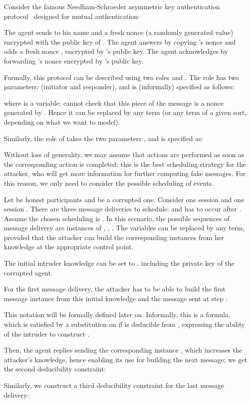 \documentclass[acmtocl,acmnow]{acmtrans2m}
\newcommand{\dedcons}[1]{deducibility constraint}
\begin{document}
\begin{example}\label{ex:ns}
Consider the famous Needham-Schroeder asymmetric key
authentication protocol~\cite{NS78} designed for mutual authentication:

The agent  sends to  his name and a fresh nonce (a randomly generated value) encrypted with the public
key of . The agent  answers by copying 's nonce and adds a fresh nonce , encrypted by 's
public key. The agent  acknowledges by forwarding 's nonce encrypted by 's public key. 

Formally, this protocol can be described using two roles  and .
The role  has two parameters:  (initiator and responder), and
is (informally) specified as follows:

where  is a variable:  cannot check that this piece of the message is
a nonce generated by . Hence it can be replaced by any term (or any term
of a given sort, depending on what we want to model). 

Similarly, the role of  takes the two parameters , and is specified as:







Without loss of generality, we may assume that  actions are
performed as soon as the corresponding  action is completed:
this is the best scheduling strategy for the attacker, who will get more
information for further computing fake messages. For this reason, we only need
to consider the possible scheduling of  events.


Let  be honest participants and  be a corrupted one.
Consider one session  and one session .
There are three message deliveries to schedule:  and  has to
occur after . Assume the chosen scheduling is .
In this scenario, the possible sequences of message  delivery are
instances of , ,
.  The variables  can be replaced by any term, provided that
the attacker can build the corresponding instances from her knowledge at
the appropriate control point.


The initial intruder knowledge can be set to
, including the private
key of the corrupted agent.

For the first message delivery, the attacker has to be able to build
the first message instance from this initial knowledge and the message
sent at step :


This notation will be formally defined later on. Informally, this is
a formula, which is satisfied by a substitution  on  if
 is deducible from , expressing
the ability of the intruder to construct .

Then, the agent  replies sending the corresponding instance 
, which increases the attacker's knowledge,
hence enabling its use for building the next message; we get the second
\dedcons{}:

Similarly, we construct a third \dedcons{} for the last message delivery:




\end{example}
\end{document}
